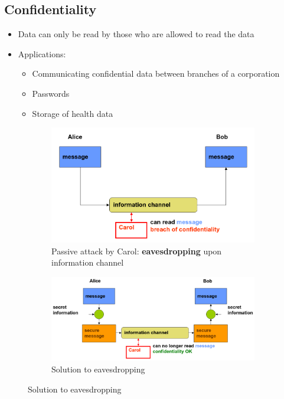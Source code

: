 \documentclass[11pt,british,faculty=ea,layout=titlefont,underline=false,titleUppercase=true,titleUnderline=true,hidelinks]{ugent2016-report}
\begin{document}
		\subsection{Confidentiality} \label{sub:confidentiality}
			\begin{itemize}
				\item Data can only be read by those who are allowed to read the data
				\item Applications:
				\begin{itemize}
					\item Communicating confidential data between branches of a corporation
					\item Passwords
					\item Storage of health data
				\end{itemize}
			\end{itemize}
			\begin{figure}[h]
				\centering
				\begin{subfigure}{.40\textwidth}
					\centering
					\includegraphics[width=\linewidth]{images/data-confidentiality-threat.png}
					\caption{Passive attack by Carol: \textbf{eavesdropping} upon information channel}
					\label{fig:eavesdropping}
				\end{subfigure}
				\begin{subfigure}{.50\textwidth}
					\centering
					\includegraphics[width=\linewidth]{images/data-confidentiality-solution.png}
					\caption{Solution to eavesdropping}
					\label{fig:eavesdropping-solution}
				\end{subfigure}
			\end{figure}
			
\end{document}

